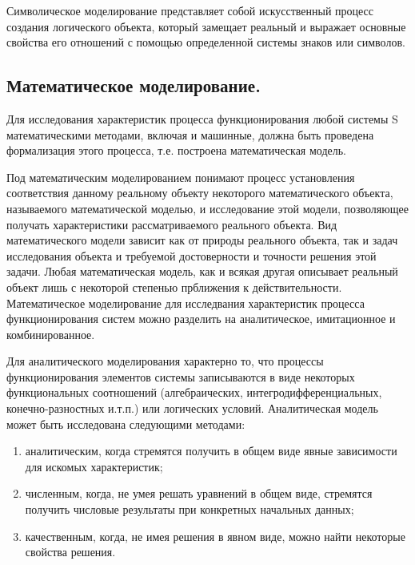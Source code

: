     Символическое моделирование представляет собой искусственный процесс создания логического объекта, который замещает реальный и выражает основные свойства его отношений с помощью определенной системы знаков или символов.

\subsection{Математическое моделирование.}

 Для исследования характеристик процесса функционирования любой системы S математическими методами, включая и машинные, должна быть проведена формализация этого процесса, т.е. построена математическая модель.

    Под математическим моделированием понимают процесс установления соответствия данному реальному объекту некоторого математического объекта, называемого математической моделью, и исследование этой модели, позволяющее получать характеристики рассматриваемого реального объекта. Вид математического модели зависит как от природы реального объекта, так и задач исследования объекта и требуемой достоверности и точности решения этой задачи. Любая математическая модель, как и всякая другая описывает реальный объект лишь с некоторой степенью прближения к действительности. Математическое моделирование для исследвания характеристик процесса функционирования систем можно разделить на аналитическое, имитационное и комбинированное.

    Для аналитического моделирования характерно то, что процессы функционирования элементов системы записываются в виде некоторых функциональных соотношений (алгебраических, интегродифференциальных, конечно-разностных и.т.п.) или логических условий. Аналитическая модель может быть исследована следующими методами:
\begin{enumerate}
  \item аналитическим, когда стремятся получить в общем виде явные зависимости для искомых характеристик;
  \item численным, когда, не умея решать уравнений в общем виде, стремятся получить числовые результаты при конкретных начальных данных;
  \item качественным, когда, не имея решения в явном виде, можно найти некоторые свойства решения.
\end{enumerate}

